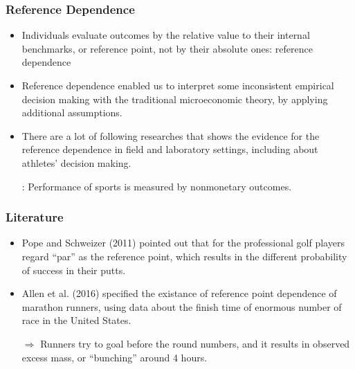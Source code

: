 \documentclass[dvipdfmx,12pt]{beamer}
\begin{document}
\begin{frame}\frametitle{Reference Dependence}
  \begin{itemize}
    \item Individuals evaluate outcomes by the relative value to their internal benchmarks, or reference point, not by their absolute ones: reference dependence

    \item Reference dependence enabled us to interpret some inconsistent empirical decision making with the traditional microeconomic theory, by applying additional assumptions.

    \item There are a lot of following researches that shows the evidence for the reference dependence in field and laboratory settings, including about athletes' decision making.

    : Performance of sports is measured by nonmonetary outcomes.

  \end{itemize}
\end{frame}

\begin{frame}\frametitle{Literature}
  \begin{itemize}

    \item Pope and Schweizer (2011) pointed out that for the professional golf players regard ``par'' as the reference point, which results in the different probability of success in their putts.

    \item Allen et al. (2016) specified the existance of reference point dependence of marathon runners, using data about the finish time of enormous number of race in the United States.

    $\Rightarrow$ Runners try to goal before the round numbers, and it results in observed excess mass, or ``bunching'' around 4 hours.

  \end{itemize}

\end{frame}
\end{document}
